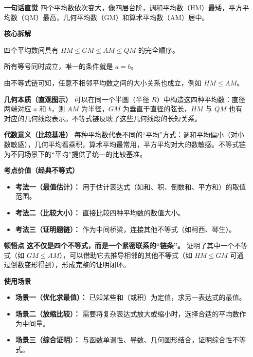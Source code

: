\begin{explanationbox}
\textbf{\textcolor{CExplanation}{一句话直觉}}
四个平均数依次变大，像四层台阶，调和平均数（HM）最矮，平方平均数（QM）最高，几何平均数（GM）和算术平均数（AM）居中。

\medskip
\textbf{\textcolor{CExplanation}{核心拆解}}
\begin{description}[style=nextline, leftmargin=2.8em, labelsep=0.5em, itemsep=0.45em]
    \item[\textbf{要点一（全序关系）：}] 四个平均数间具有 $HM \le GM \le AM \le QM$ 的完全顺序。
    \item[\textbf{要点二（取等条件）：}] 所有等号同时成立，唯一的条件就是 $a=b$。
    \item[\textbf{要点三（传递性）：}] 由不等式链可知，任意不相邻平均数之间的大小关系也成立，例如 $HM \le AM$。
\end{description}

\medskip
\textbf{\textcolor{CExplanation}{几何本质（直观图示）}}
可以在同一个半圆（半径 $R$）中构造这四种平均数：直径两端对应 $a$ 和 $b$，则 $AM$ 为半径，$GM$ 为垂直于直径的弦长，$HM$ 与 $QM$ 也有对应的几何线段表示。不等式链反映了这些几何线段的长短关系。

\medskip
\textbf{\textcolor{CExplanation}{代数意义（比较基准）}}
每种平均数代表不同的“平均”方式：调和平均偏小（对小数敏感），几何平均看乘积，算术平均最常用，平方平均对大的数敏感。不等式链为不同场景下的“平均”提供了统一的比较基准。

\medskip
\textbf{\textcolor{CExplanation}{考点价值（经典不等式）}}
\begin{itemize}[leftmargin=*, itemsep=0.5em, topsep=0.4em]
    \item \textbf{考法一（最值估计）：} 用于估计表达式（如和、积、倒数和、平方和）的取值范围。
    \item \textbf{考法二（比较大小）：} 直接比较四种平均数的数值大小。
    \item \textbf{考法三（证明题链）：} 作为中间桥梁，连接其他不等式（如柯西、琴生）。
\end{itemize}

\medskip
\textbf{\textcolor{CExplanation}{顿悟点}}
\textbf{这不仅是四个不等式，而是一个紧密联系的“链条”。} 证明了其中一个不等式（如 $GM \le AM$），可以借助它去推导相邻的其他不等式（如 $HM \le GM$ 可通过倒数变形得到），形成完整的证明闭环。

\medskip
\textbf{\textcolor{CExplanation}{使用场景}}
\begin{itemize}[leftmargin=*, itemsep=0.5em, topsep=0.4em]
    \item \textbf{场景一（优化求最值）：} 已知某些和（或积）为定值，求另一表达式的最值。
    \item \textbf{场景二（放缩比较）：} 需要将复杂表达式放大或缩小时，选择合适的平均数作为中间量。
    \item \textbf{场景三（综合证明）：} 与函数单调性、导数、几何图形结合，证明综合性不等式。
\end{itemize}
\end{explanationbox}
